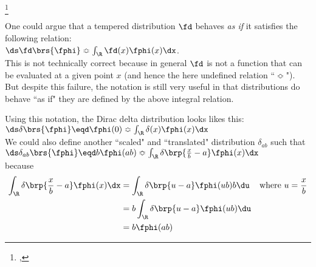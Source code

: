 \begin{definition}
\footnote{
  ,
  }
\label{def:dirac}
\end{definition}

One could argue that a tempered distribution $\fd$ behaves \emph{as if} it satisfies the following relation:
  \\\indentx$\ds\fd\brs{\fphi}\Bumpeq\int_\R \fd(x) \fphi(x) \dx$.\\
This is not technically correct because in general $\fd$ is not a function that can be evaluated at a given point $x$
(and hence the here undefined relation ``$\Bumpeq$").
But despite this failure, the notation is still very useful in that 
distributions do behave ``as if" they are defined by the above integral relation.

Using this notation, the Dirac delta distribution looks likes this:
  \\\indentx$\ds\delta\brs{\fphi}\eqd\fphi(0) \Bumpeq \int_\R \delta(x)\fphi(x)\dx$\\

We could also define another ``scaled" and ``translated" distribution $\delta_{ab}$ such that
  \\\indentx$\ds\delta_{ab}\brs{\fphi}\eqd b\fphi(ab) \Bumpeq \int_\R \delta\brp{\frac{x}{b}-a}\fphi(x)\dx$\\
because
\begin{align*}
   \int_\R \delta\brp{\frac{x}{b}-a}\fphi(x)\dx
     &= \int_\R \delta\brp{u-a}\fphi(ub)b\du
     && \text{where $u=\frac{x}{b}$}
   \\&= b\int_\R \delta\brp{u-a}\fphi(ub)\du
   \\&= b\fphi(ab)
\end{align*}


